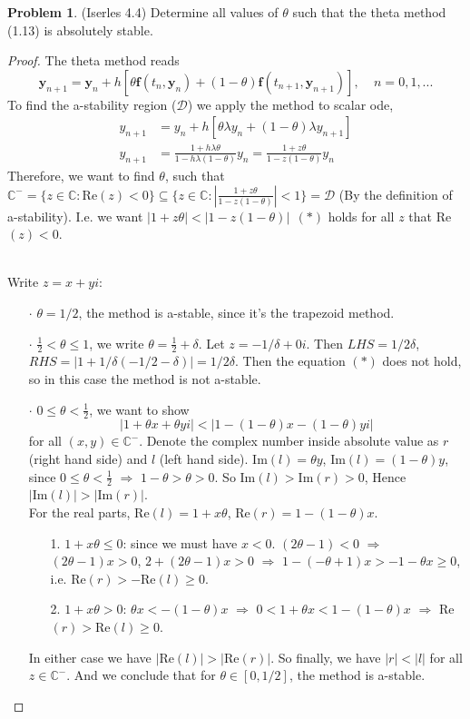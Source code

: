 \documentclass[a4paper, 10pt]{article}
\theoremstyle{definition}
\newtheorem{problem}{Problem}
\theoremstyle{hSol}
\begin{document}
\begin{problem} (Iserles 4.4) Determine all values of $\theta$ such that the theta method (1.13) is absolutely stable.
\end{problem}
\begin{proof} The theta method reads
$$
\bm{y}_{n+1} = \bm{y}_n + h[\theta \bm{f}(t_n, \bm{y}_n) + (1-\theta)\bm{f}(t_{n+1}, \bm{y}_{n+1})],~~~~~n=0,1,...
$$
To find the a-stability region ($\mathcal{D}$) we apply the method to scalar ode, 
\begin{equation}
  \begin{split}
      y_{n+1} &= y_n + h[\theta \lambda y_n + (1-\theta) \lambda y_{n+1}] \\
      y_{n+1} &= \frac{1+ h \lambda \theta}{1-h \lambda (1-\theta)} y_n = \frac{1+ z \theta}{1-z(1-\theta)} y_n
  \end{split}
\end{equation}
Therefore, we want to find $\theta$, such that $\mathbb{C}^-=\{z\in \mathbb{C}: \text{Re}(z)<0\} \subseteq\{z\in \mathbb{C}: \left| \tfrac{1+ z \theta}{1-z(1-\theta)}\right|<1\} = \mathcal{D}$ (By the definition of a-stability). I.e. we want $|1+z \theta|<|1-z(1-\theta)|~~(*)$ holds for all $z$ that Re$(z)<0$.

~\\
Write $z=x+yi$: 
\begin{itemize}
  \item[$\cdot$] $\theta=1/2$, the method is a-stable, since it's the trapezoid method.
  \item[$\cdot$] $\frac{1}{2}<\theta\leq 1$, we write $\theta=\frac{1}{2}+\delta$. Let $z=-1/\delta + 0i$. Then $LHS=1/2\delta$, $RHS=|1+1/\delta(-1/2-\delta)|=1/2\delta$. Then the equation $(*)$ does not hold, so in this case the method is not a-stable.
  \item[$\cdot$] $0\leq \theta<\frac{1}{2}$, we want to show
  $$
  |1+ \theta x + \theta y i|<|1-(1-\theta)x-(1-\theta)yi|
  $$
  for all $(x,y)\in \mathbb{C}^-$. Denote the complex number inside absolute value as $r$ (right hand side) and $l$ (left hand side). Im$(l)=\theta y$, Im$(l)=(1-\theta)y$, since $0\leq \theta<\frac{1}{2}$ $\Rightarrow$ $1-\theta > \theta >0$. So $\text{Im}(l)>\text{Im}(r)>0$, Hence $|\text{Im}(l)|>|\text{Im}(r)|$.
  ~\\
  For the real parts, Re$(l)=1+x\theta$, Re$(r)=1-(1-\theta)x$.
  \begin{itemize}
    \item[1.] $1+x\theta \leq 0$: since we must have $x<0$. $(2\theta - 1)<0$ $\Rightarrow$ $(2\theta-1)x > 0$, $2+(2\theta-1)x >0$ $\Rightarrow$ $1-(-\theta+1)x > -1-\theta x \geq 0$, i.e. Re$(r)>-\text{Re}(l)\geq 0$.
    \item[2.] $1+x\theta > 0$: $\theta x < -(1-\theta)x$ $\Rightarrow$ $0 < 1+\theta x < 1-(1-\theta)x$ $\Rightarrow$ Re$(r)>\text{Re}(l)\geq 0$.
  \end{itemize}
  In either case we have $|\text{Re}(l)|>|\text{Re}(r)|$. So finally, we have $|r|<|l|$ for all $z\in \mathbb{C}^{-}$. And we conclude that for $\theta \in [0, 1/2]$, the method is a-stable.
\end{itemize}

\end{proof}
\end{document}
